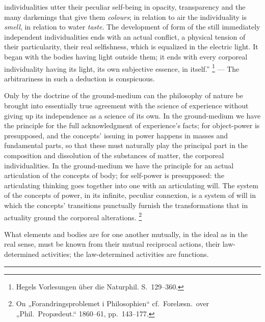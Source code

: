 \documentclass[12pt,a4paper]{book}
\renewcommand{\thefootnote}{*)}
\newcommand{\streg}{\begin{center}\rule{2cm}{0.4pt}\end{center}}
\begin{document}
individualities utter their peculiar self-being in opacity, transparency and the many darkenings that give them
\emph{colours}; in relation to air the individuality is \emph{smell}, in relation to water \emph{taste}. The
development of form of the still immediately independent individualities ends with an actual conflict, a physical
tension of their particularity, their real selfishness, which is equalized in the electric light. It began with the
bodies having light outside them; it ends with
every corporeal individuality having its light, its own subjective essence, in itself.''%
\footnote{%
Hegels Vorlesungen über die Naturphil. S.\ 129--360.}
--- The arbitrariness in such a deduction is conspicuous.

Only by the doctrine of the ground-medium can the philosophy of nature be brought into essentially true agreement with
the science of experience without giving up its independence as a science of its own. In the ground-medium we have the
principle for the full acknowledgment of experience's facts; for object-power is presupposed, and the concepts' issuing
in power happens in masses and fundamental parts, so that these must naturally play the principal part in the
composition and dissolution of the substances of matter, the corporeal individualities. In the ground-medium we have
the principle for an actual articulation of the concepts of body; for self-power is presupposed: the articulating
thinking goes together into one with an articulating will. The system of the concepts of power, in its infinite,
peculiar connexion, is a system of will in which the concepts' transitions punctually furnish the transformations that
in actuality ground the corporeal alterations.%
\renewcommand{\thefootnote}{**)}%
\footnote{%
On „Forandringsproblemet i Philosophien“ cf.\ Forelæsn.\ over „Phil.\ Propædeut.“ 1860--61, pp.\ 143--177.}%
\renewcommand{\thefootnote}{*)}

What elements and bodies are for one another mutually, in the ideal as in the real sense, must be known from their
mutual reciprocal actions, their law-determined activities; the law-determined activities are functions.

\streg
\end{document}
